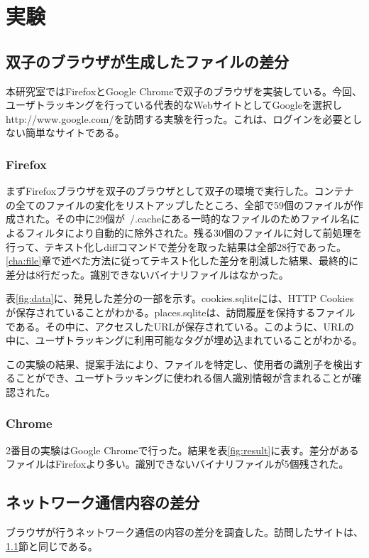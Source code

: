 \documentclass[a4paper,twocolumn,10pt]{jarticle}
\begin{document}
\section{実験}
\subsection{双子のブラウザが生成したファイルの差分}
\label{sec:file}

本研究室ではFirefoxとGoogle Chromeで双子のブラウザを実装している。今回、ユーザトラッキングを行っている代表的なWebサイトとしてGoogleを選択しhttp://www.google.com/を訪問する実験を行った。これは、ログインを必要としない簡単なサイトである。

\subsubsection{Firefox}
まずFirefoxブラウザを双子のブラウザとして双子の環境で実行した。コンテナの全てのファイルの変化をリストアップしたところ、全部で59個のファイルが作成された。その中に29個が~/.cacheにある一時的なファイルのためファイル名によるフィルタにより自動的に除外された。残る30個のファイルに対して前処理を行って、テキスト化しdiffコマンドで差分を取った結果は全部28行であった。\ref{cha:file}章で述べた方法に従ってテキスト化した差分を削減した結果、最終的に差分は8行だった。識別できないバイナリファイルはなかった。

表\ref{fig:data}に、発見した差分の一部を示す。cookies.sqliteには、HTTP Cookiesが保存されていることがわかる。places.sqliteは、訪問履歴を保持するファイルである。その中に、アクセスしたURLが保存されている。このように、URLの中に、ユーザトラッキングに利用可能なタグが埋め込まれていることがわかる。

この実験の結果、提案手法により、ファイルを特定し、使用者の識別子を検出することができ、ユーザトラッキングに使われる個人識別情報が含まれることが確認された。

\subsubsection{Chrome}

2番目の実験はGoogle Chromeで行った。結果を表\ref{fig:result}に表す。差分があるファイルはFirefoxより多い。識別できないバイナリファイルが5個残された。

\label{sec:one}
\subsection{ネットワーク通信内容の差分}
ブラウザが行うネットワーク通信の内容の差分を調査した。訪問したサイトは、\ref{sec:file}節と同じである。
\end{document}
